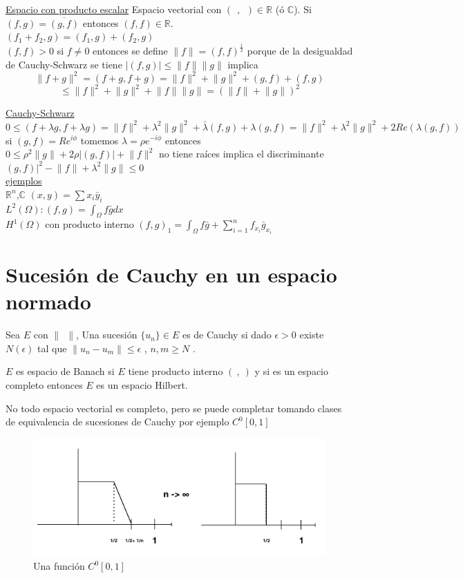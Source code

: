 \documentclass[a4paper,10pt]{book}
\def \ep{\epsilon}
\begin{document}
\underline{Espacio con producto escalar}
Espacio vectorial con $( \ \ , \ \ )  \in \mathbb{R}$ (ó $\mathbb{C}$). Si $(f,g)=\overline{(g,f)}$   
entonces $(f,f)\in \mathbb{R}$. \\

$(f_1+f_2,g)=(f_1,g)+(f_2,g)$  \\
$(f,f)>0$ si $f\neq 0$ entonces se define $\lVert f \rVert = (f,f)^{\frac{1}{2}}$ porque
de la desigualdad de Cauchy-Schwarz se tiene
$|(f,g)| \leq \lVert f \rVert \lVert g\rVert$ implica \\

\[\lVert f+g \rVert^2 = (f+g,f+g) =\lVert f\rVert^2 + \lVert g\rVert^2 + (g,f)+(f,g)\]
\[ \leq \lVert f\rVert^2 + \lVert g\rVert^2 + \lVert f \rVert\lVert g \rVert= \left( \lVert f\rVert + \lVert g\rVert  \right)^2 \]

\underline{Cauchy-Schwarz} \\
$0\leq (f+\lambda g, f + \lambda g) = \lVert f \rVert^2 +\lambda^2\lVert g \rVert^2 + \bar{\lambda} (f,g)+ \lambda (g,f)= \lVert f \rVert^2+ \lambda^2\lVert g \rVert^2 +2 Re (\lambda(g,f))$
si $(g,f)= R e^{i \phi} $ tomemos $\lambda= \rho e^{-i\phi}$  entonces\\
$0\leq \rho^2 \lVert g\rVert +2 \rho | (g,f) | + \lVert f\rVert^2 $
no tiene raíces implica el discriminante \\
$ (g,f) |^2 - \lVert f \rVert+ \lambda^2\lVert g \rVert \leq 0$\\
\underline{ejemplos} \\
$\mathbb{R}^n$,$\mathbb{C}$ $(x,y)= \sum\limits x_i \bar{y}_i$ \\
$L^2(\Omega) : (f,g) =\int_{\Omega} f \bar{g} dx$\\
$H^1(\Omega)$ con producto interno $(f,g)_1 = \int_{\Omega} f\bar{g} + \sum\limits_{i=1}^{n} f_{x_i} \bar{g}_{x_i}$

\section{Sucesión de Cauchy en un espacio normado}
Sea $E$ con $ \lVert \ \ \rVert$, Una sucesión $\{ u_n\}\in E$ es de Cauchy si dado $\epsilon>0$
existe $N(\epsilon)$ tal que $\lVert u_n -u_m\rVert \leq \ep $ , $n,m\geq N$ .

$E$ es espacio de Banach si $E$ tiene producto interno $(\ ,\ )$ y si es un espacio completo 
entonces $E$ es un espacio Hilbert.

No todo espacio vectorial es completo, pero se puede completar tomando clases de equivalencia de sucesiones
de Cauchy por ejemplo $C^0[0,1]$    
\begin{figure}
    \centering
    \includegraphics[width=0.5\linewidth]{Screen Shot 2024-01-21 at 10.59.57.png}
    \caption{Una función $C^0[0,1]$ }
    \label{fig:enter-label}
\end{figure}
\end{document}
